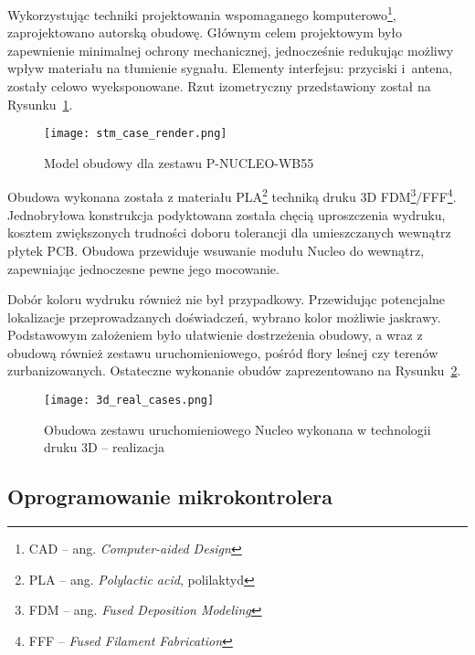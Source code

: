 Wykorzystując techniki projektowania wspomaganego komputerowo\footnote{\gls{CAD} -- ang. \textit{Computer-aided Design}},
zaprojektowano autorską obudowę. Głównym celem projektowym było zapewnienie minimalnej ochrony
mechanicznej, jednocześnie redukując możliwy wpływ materiału na tłumienie sygnału. Elementy
interfejsu: przyciski i~antena, zostały celowo wyeksponowane. Rzut izometryczny przedstawiony został
na Rysunku~\ref{rys:obudowa_model3d}.


\begin{figure}[!htb]
	\centering \texttt{[image: stm\_case\_render.png]}
	\caption{Model obudowy dla zestawu P-NUCLEO-WB55}
	\label{rys:obudowa_model3d}
\end{figure}

Obudowa wykonana została z materiału \gls{PLA}\footnote{PLA -- ang. \textit{Polylactic acid}, polilaktyd} techniką
druku 3D \gls{FDM}\footnote{FDM -- ang. \textit{Fused Deposition Modeling}}/\gls{FFF}\footnote{FFF -- \textit{Fused Filament Fabrication}}.
Jednobryłowa konstrukcja podyktowana została chęcią uproszczenia wydruku, kosztem zwiększonych trudności
doboru tolerancji dla umieszczanych wewnątrz płytek \gls{PCB}. Obudowa przewiduje wsuwanie modułu Nucleo
do wewnątrz, zapewniając jednoczesne pewne jego mocowanie.

Dobór koloru wydruku również nie był przypadkowy. Przewidując potencjalne lokalizacje przeprowadzanych
doświadczeń, wybrano kolor możliwie jaskrawy. Podstawowym założeniem było ułatwienie dostrzeżenia
obudowy, a wraz z obudową również zestawu uruchomieniowego, pośród flory leśnej czy terenów
zurbanizowanych. Ostateczne wykonanie obudów zaprezentowano na Rysunku~\ref{rys:obudowa_wykonanie}.

\begin{figure}[!htb]
	\centering \texttt{[image: 3d\_real\_cases.png]}
	\caption{Obudowa zestawu uruchomieniowego Nucleo wykonana w technologii druku 3D -- realizacja}
	\label{rys:obudowa_wykonanie}
\end{figure}

\subsection{Oprogramowanie mikrokontrolera} \label{prep:uc-software}

